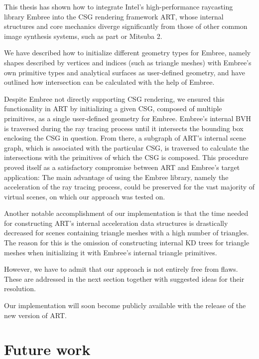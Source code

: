 \label{chap:conclusion}

This thesis has shown how to integrate Intel's high-performance raycasting library Embree into the CSG rendering framework ART, whose internal structures and core mechanics diverge significantly from those of other common image synthesis systems, such as part or Mitsuba 2.

We have described how to initialize different geometry types for Embree, namely shapes described by vertices and indices (such as triangle meshes) with Embree's own primitive types and analytical surfaces as user-defined geometry, and have outlined how intersection can be calculated with the help of Embree. 

Despite Embree not directly supporting CSG rendering, we ensured this functionality in ART by initializing a given CSG, composed of multiple primitives, as a single user-defined geometry for Embree. Embree's internal BVH is traversed during the ray tracing process until it intersects the bounding box enclosing the CSG in question. From there, a subgraph of ART's internal scene graph, which is associated with the particular CSG, is traversed to calculate the intersections with the primitives of which the CSG is composed. This procedure proved itself as a satisfactory compromise between ART and Embree's target application: The main advantage of using the Embree library, namely the acceleration of the ray tracing process, could be preserved for the vast majority of virtual scenes, on which our approach was tested on.

Another notable accomplishment of our implementation is that the time needed for constructing ART's internal acceleration data structures is drastically decreased for scenes containing triangle meshes with a high number of triangles. The reason for this is the omission of constructing internal KD trees for triangle meshes when initializing it with Embree's internal triangle primitives.

However, we have to admit that our approach is not entirely free from flaws. These are addressed in the next section together with suggested ideas for their resolution.  

Our implementation will soon become publicly available with the release of the new version of ART.

\section*{Future work}

